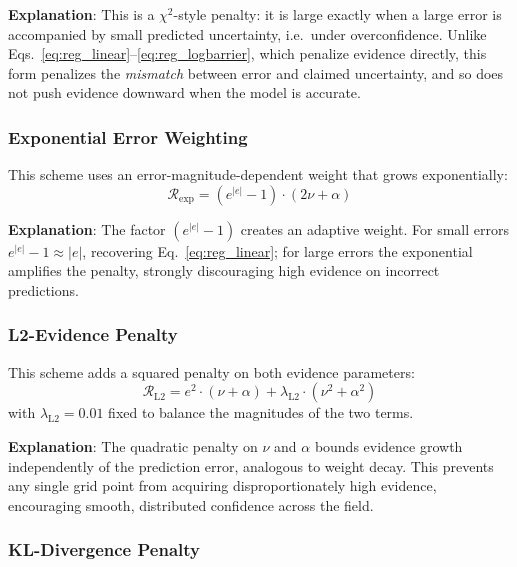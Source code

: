 \textbf{Explanation}: This is a $\chi^2$-style penalty: it is large exactly when a large error is accompanied by
small predicted uncertainty, i.e.\ under overconfidence. Unlike Eqs.~\eqref{eq:reg_linear}--\eqref{eq:reg_logbarrier},
which penalize evidence directly, this form penalizes the \emph{mismatch} between error and claimed uncertainty,
and so does not push evidence downward when the model is accurate.

\subsubsection{Exponential Error Weighting}

This scheme uses an error-magnitude-dependent weight that grows exponentially:
\begin{equation}
    \mathcal{R}_{\text{exp}} = \left(e^{|e|} - 1\right) \cdot (2\nu + \alpha)
    \label{eq:reg_exp}
\end{equation}

\textbf{Explanation}: The factor $(e^{|e|} - 1)$ creates an adaptive weight. For small errors
$e^{|e|} - 1 \approx |e|$, recovering Eq.~\eqref{eq:reg_linear}; for large errors the exponential amplifies the
penalty, strongly discouraging high evidence on incorrect predictions.

\subsubsection{L2-Evidence Penalty}

This scheme adds a squared penalty on both evidence parameters:
\begin{equation}
    \mathcal{R}_{\text{L2}} = e^2 \cdot (\nu + \alpha) + \lambda_{\text{L2}} \cdot \left(\nu^2 + \alpha^2\right)
    \label{eq:reg_l2}
\end{equation}
with $\lambda_{\text{L2}} = 0.01$ fixed to balance the magnitudes of the two terms.

\textbf{Explanation}: The quadratic penalty on $\nu$ and $\alpha$ bounds evidence growth independently of the
prediction error, analogous to weight decay. This prevents any single grid point from acquiring
disproportionately high evidence, encouraging smooth, distributed confidence across the field.

\subsubsection{KL-Divergence Penalty}

